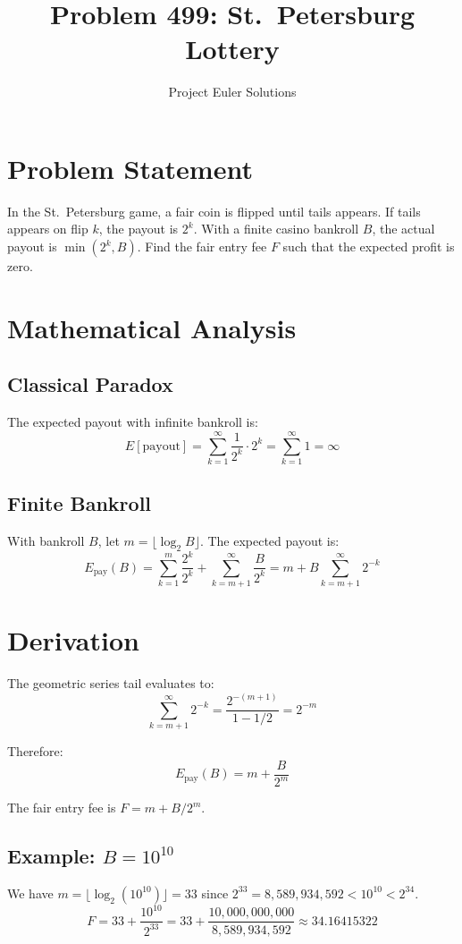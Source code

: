 \documentclass[11pt]{article}
\title{Problem 499: St.\ Petersburg Lottery}
\author{Project Euler Solutions}
\date{}
\begin{document}
\maketitle

\section{Problem Statement}
In the St.\ Petersburg game, a fair coin is flipped until tails appears. If tails appears on flip $k$, the payout is $2^k$. With a finite casino bankroll $B$, the actual payout is $\min(2^k, B)$. Find the fair entry fee $F$ such that the expected profit is zero.

\section{Mathematical Analysis}

\subsection{Classical Paradox}
The expected payout with infinite bankroll is:
\[
E[\text{payout}] = \sum_{k=1}^{\infty} \frac{1}{2^k} \cdot 2^k = \sum_{k=1}^{\infty} 1 = \infty
\]

\subsection{Finite Bankroll}
With bankroll $B$, let $m = \lfloor \log_2 B \rfloor$. The expected payout is:
\[
E_{\text{pay}}(B) = \sum_{k=1}^{m} \frac{2^k}{2^k} + \sum_{k=m+1}^{\infty} \frac{B}{2^k}
= m + B \sum_{k=m+1}^{\infty} 2^{-k}
\]

\section{Derivation}
The geometric series tail evaluates to:
\[
\sum_{k=m+1}^{\infty} 2^{-k} = \frac{2^{-(m+1)}}{1 - 1/2} = 2^{-m}
\]

Therefore:
\[
E_{\text{pay}}(B) = m + \frac{B}{2^m}
\]

The fair entry fee is $F = m + B / 2^m$.

\subsection{Example: $B = 10^{10}$}
We have $m = \lfloor \log_2(10^{10}) \rfloor = 33$ since $2^{33} = 8{,}589{,}934{,}592 < 10^{10} < 2^{34}$.
\[
F = 33 + \frac{10^{10}}{2^{33}} = 33 + \frac{10{,}000{,}000{,}000}{8{,}589{,}934{,}592} \approx 34.16415322
\]
\end{document}
